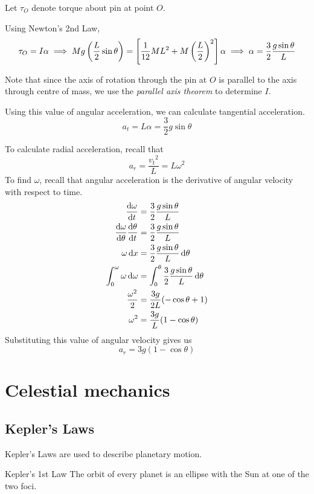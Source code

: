 \begin{solution}
Let $\tau_O$ denote torque about pin at point $O$. 

Using Newton's 2nd Law,
\[ \tau_O = I\alpha \implies Mg\left(\frac{L}{2}\sin\theta\right) = \left[\frac{1}{12}ML^2+M\left(\frac{L}{2}\right)^2\right]\alpha \implies \alpha = \frac{3}{2}\frac{g\sin\theta}{L} \]

Note that since the axis of rotation through the pin at $O$ is parallel to the axis through centre of mass, we use the \emph{parallel axis theorem} to determine $I$.

Using this value of angular acceleration, we can calculate tangential acceleration.
\[ a_t = L\alpha = \boxed{\frac{3}{2}g\sin\theta} \]

To calculate radial acceleration, recall that 
\[ a_r = \frac{{v_t}^2}{L} = L\omega^2 \]
To find $\omega$, recall that angular acceleration is the derivative of angular velocity with respect to time.
\begin{align*}
\odv{\omega}{t} &= \frac{3}{2}\frac{g\sin\theta}{L} \\
\odv{\omega}{\theta}\odv{\theta}{t} &= \frac{3}{2}\frac{g\sin\theta}{L}\\
\omega \dd{x} &= \frac{3}{2}\frac{g\sin\theta}{L}\dd{\theta} \\
\int_0^{\omega}\omega \dd{\omega} &= \int_0^{\theta}\frac{3}{2}\frac{g\sin\theta}{L}\dd{\theta} \\
\frac{\omega^2}{2} &= \frac{3g}{2L}(-\cos\theta+1)\\
\omega^2 &= \frac{3g}{L}(1-\cos\theta)
\end{align*}
Substituting this value of angular velocity gives us 
\[ \boxed{a_r=3g(1-\cos\theta)} \]
\end{solution}

\chapter{Celestial mechanics}
\section{Kepler's Laws}
Kepler's Laws are used to describe planetary motion.
\begin{thrm}{Kepler's 1st Law}{}
The orbit of every planet is an ellipse with the Sun at one of the two foci.
\end{thrm}

